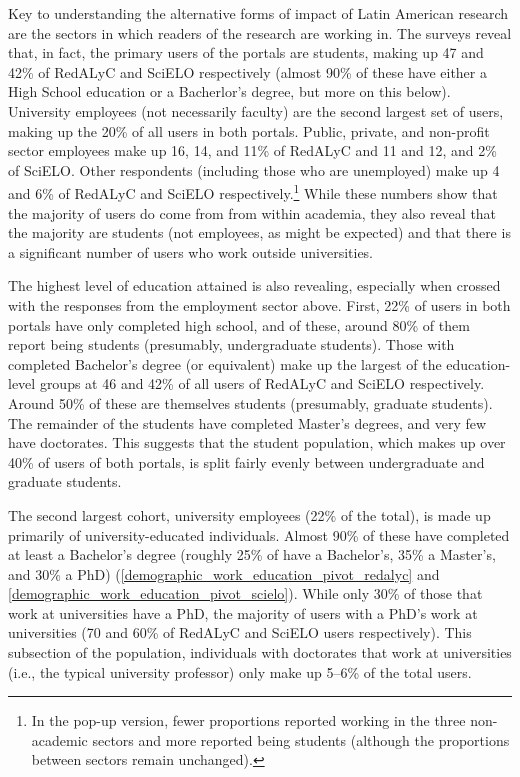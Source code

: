 Key to understanding the alternative forms of impact of Latin American research are the sectors in which readers of the research are working in. The surveys reveal that, in fact, the primary users of the portals are students, making up 47 and 42\% of RedALyC and SciELO respectively (almost 90\% of these have either a High School education or a Bacherlor's degree, but more on this below). University employees (not necessarily faculty) are the second largest set of users, making up the 20\% of all users in both portals. Public, private, and non-profit sector employees make up 16, 14, and 11\% of RedALyC and 11 and 12, and 2\% of SciELO. Other respondents (including those who are unemployed) make up 4 and 6\% of RedALyC and SciELO respectively.\footnote{In the pop-up version, fewer proportions reported working in the three non-academic sectors and more reported being students (although the proportions between sectors remain unchanged).} While these numbers show that the majority of users do come from from within academia, they also reveal that the majority are students (not employees, as might be expected) and that there is a significant number of users who work outside universities.

The highest level of education attained is also revealing, especially when crossed with the responses from the employment sector above. First, 22\% of users in both portals have only completed high school, and of these, around 80\% of them report being students (presumably, undergraduate students). Those with completed Bachelor's degree (or equivalent) make up the largest of the education-level groups at 46 and 42\% of all users of RedALyC and SciELO respectively. Around 50\% of these are themselves students (presumably, graduate students). The remainder of the students have completed Master's degrees, and very few have doctorates. This suggests that the student population, which makes up over 40\% of users of both portals, is split fairly evenly between undergraduate and graduate students.

The second largest cohort, university employees (22\% of the total), is made up primarily of university-educated individuals. Almost 90\% of these have completed at least a Bachelor's degree (roughly 25\% of have a Bachelor's, 35\% a Master's, and 30\% a PhD) (\autoref{demographic_work_education_pivot_redalyc} and \autoref{demographic_work_education_pivot_scielo}). While only 30\% of those that work at universities have a PhD, the majority of users with a PhD's work at universities (70 and 60\% of RedALyC and SciELO users respectively). This subsection of the population, individuals with doctorates that work at universities (i.e., the typical university professor) only make up 5--6\% of the total users.

